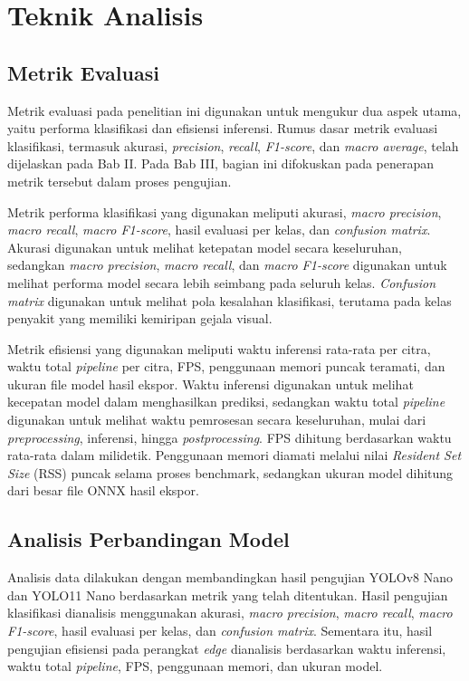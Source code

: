 \section{Teknik Analisis}
\begin{sectioncontent}
\subsection{Metrik Evaluasi}
\begin{subsectioncontent}
    \hspace{\parindent}Metrik evaluasi pada penelitian ini digunakan untuk mengukur dua aspek utama, yaitu performa klasifikasi dan efisiensi inferensi. Rumus dasar metrik evaluasi klasifikasi, termasuk akurasi, \textit{precision}, \textit{recall}, \textit{F1-score}, dan \textit{macro average}, telah dijelaskan pada Bab II. Pada Bab III, bagian ini difokuskan pada penerapan metrik tersebut dalam proses pengujian.

    Metrik performa klasifikasi yang digunakan meliputi akurasi, \textit{macro precision}, \textit{macro recall}, \textit{macro F1-score}, hasil evaluasi per kelas, dan \textit{confusion matrix}. Akurasi digunakan untuk melihat ketepatan model secara keseluruhan, sedangkan \textit{macro precision}, \textit{macro recall}, dan \textit{macro F1-score} digunakan untuk melihat performa model secara lebih seimbang pada seluruh kelas. \textit{Confusion matrix} digunakan untuk melihat pola kesalahan klasifikasi, terutama pada kelas penyakit yang memiliki kemiripan gejala visual.

    Metrik efisiensi yang digunakan meliputi waktu inferensi rata-rata per citra, waktu total \textit{pipeline} per citra, FPS, penggunaan memori puncak teramati, dan ukuran file model hasil ekspor. Waktu inferensi digunakan untuk melihat kecepatan model dalam menghasilkan prediksi, sedangkan waktu total \textit{pipeline} digunakan untuk melihat waktu pemrosesan secara keseluruhan, mulai dari \textit{preprocessing}, inferensi, hingga \textit{postprocessing}. FPS dihitung berdasarkan waktu rata-rata dalam milidetik. Penggunaan memori diamati melalui nilai \textit{Resident Set Size} (RSS) puncak selama proses benchmark, sedangkan ukuran model dihitung dari besar file ONNX hasil ekspor.
\end{subsectioncontent}

\subsection{Analisis Perbandingan Model}
\begin{subsectioncontent}
    \hspace{\parindent}Analisis data dilakukan dengan membandingkan hasil pengujian YOLOv8 Nano dan YOLO11 Nano berdasarkan metrik yang telah ditentukan. Hasil pengujian klasifikasi dianalisis menggunakan akurasi, \textit{macro precision}, \textit{macro recall}, \textit{macro F1-score}, hasil evaluasi per kelas, dan \textit{confusion matrix}. Sementara itu, hasil pengujian efisiensi pada perangkat \textit{edge} dianalisis berdasarkan waktu inferensi, waktu total \textit{pipeline}, FPS, penggunaan memori, dan ukuran model.


\end{subsectioncontent}
\end{sectioncontent}
